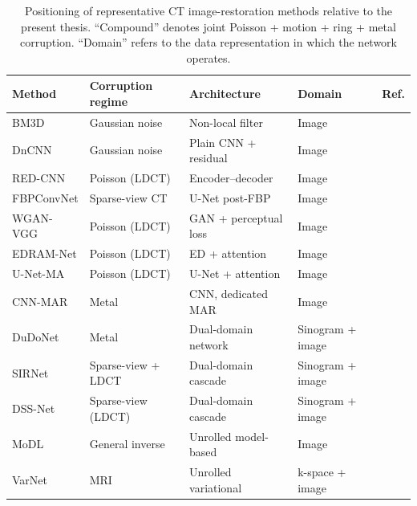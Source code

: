 \begin{table}[!htb]
    \centering
    \caption[Positioning of representative CT restoration methods.]{Positioning of representative CT image-restoration methods relative to the present thesis.
    ``Compound'' denotes joint Poisson + motion + ring + metal corruption. ``Domain'' refers to the data representation in which the network operates.}
    \label{tab:related_work}
    \small
    \setlength{\tabcolsep}{4pt}
    \begin{tabular}{@{}l l l l c@{}}
        \toprule
        Method        & Corruption regime    & Architecture           & Domain           & Ref. \\
        \midrule
        BM3D          & Gaussian noise       & Non-local filter       & Image            & \cite{Dabov2007}      \\
        DnCNN         & Gaussian noise       & Plain CNN + residual   & Image            & \cite{Zhang2017}      \\
        RED-CNN       & Poisson (LDCT)       & Encoder--decoder       & Image            & \cite{Chen2017}       \\
        FBPConvNet    & Sparse-view CT       & U-Net post-FBP         & Image            & \cite{Jin2017}        \\
        WGAN-VGG      & Poisson (LDCT)       & GAN + perceptual loss  & Image            & \cite{Yang2018WGAN}   \\
        EDRAM-Net     & Poisson (LDCT)       & ED + attention         & Image            & \cite{Komolafe2024}   \\
        U-Net-MA      & Poisson (LDCT)       & U-Net + attention      & Image            & \cite{Zhang2023}      \\
        CNN-MAR       & Metal                & CNN, dedicated MAR     & Image            & \cite{ZhangYu2018}    \\
        DuDoNet       & Metal                & Dual-domain network    & Sinogram + image & \cite{Lin2019DuDoNet} \\
        SIRNet        & Sparse-view + LDCT   & Dual-domain cascade    & Sinogram + image & \cite{Wang2020}       \\
        DSS-Net       & Sparse-view (LDCT)   & Dual-domain cascade    & Sinogram + image & \cite{Zhang2022}      \\
        MoDL          & General inverse      & Unrolled model-based   & Image            & \cite{Aggarwal2019MoDL} \\
        VarNet        & MRI                  & Unrolled variational   & k-space + image  & \cite{Hammernik2018VarNet} \\

\end{tabular}
\end{table}
